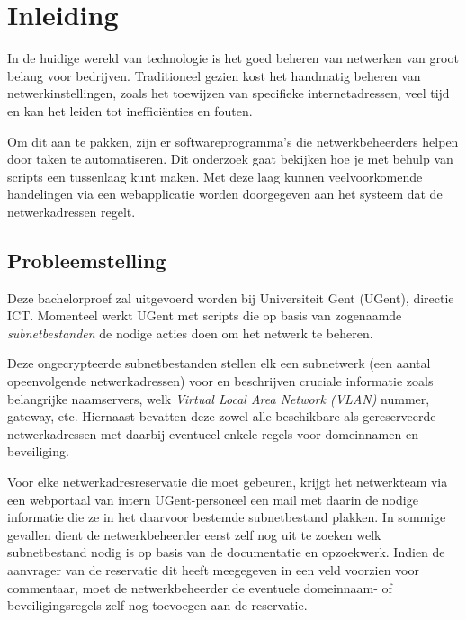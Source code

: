 \documentclass{hogent-article}
\begin{document}
\bigskip

\section{Inleiding}%
\label{sec:inleiding}
In de huidige wereld van technologie is het goed beheren van netwerken van groot belang voor bedrijven. Traditioneel gezien kost het handmatig beheren van netwerkinstellingen, zoals het toewijzen van specifieke internetadressen, veel tijd en kan het leiden tot inefficiënties en fouten.

Om dit aan te pakken, zijn er softwareprogramma's die netwerkbeheerders helpen door taken te automatiseren. Dit onderzoek gaat bekijken hoe je met behulp van scripts een tussenlaag kunt maken. Met deze laag kunnen veelvoorkomende handelingen via een webapplicatie worden doorgegeven aan het systeem dat de netwerkadressen regelt.

\subsection{Probleemstelling}
\label{sec:probleemstelling}
Deze bachelorproef zal uitgevoerd worden bij Universiteit Gent (UGent), directie ICT. Momenteel werkt UGent met scripts die op basis van zogenaamde \textit{subnetbestanden} de nodige acties doen om het netwerk te beheren. 

Deze ongecrypteerde subnetbestanden stellen elk een subnetwerk (een aantal opeenvolgende netwerkadressen) voor en beschrijven cruciale informatie zoals belangrijke naamservers, welk \textit{Virtual Local Area Network (VLAN)} nummer, gateway, etc. Hiernaast bevatten deze zowel alle beschikbare als gereserveerde netwerkadressen met daarbij eventueel enkele regels voor domeinnamen en beveiliging.

Voor elke netwerkadresreservatie die moet gebeuren, krijgt het netwerkteam via een webportaal van intern UGent-personeel een mail met daarin de nodige informatie die ze in het daarvoor bestemde subnetbestand plakken. In sommige gevallen dient de netwerkbeheerder eerst zelf nog uit te zoeken welk subnetbestand nodig is op basis van de documentatie en opzoekwerk. Indien de aanvrager van de reservatie dit heeft meegegeven in een veld voorzien voor commentaar, moet de netwerkbeheerder de eventuele domeinnaam- of beveiligingsregels zelf nog toevoegen aan de reservatie.
\end{document}
